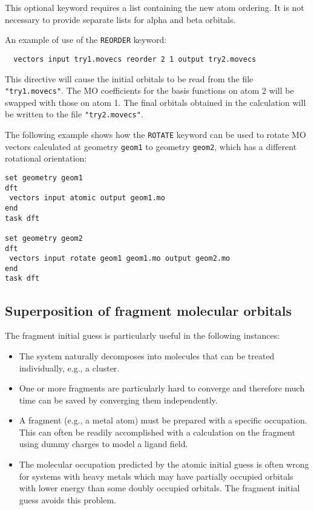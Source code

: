 This optional keyword requires a list containing the new atom ordering.
It is not necessary to provide separate lists for alpha and 
beta orbitals. 

An example of use of the \verb+REORDER+ keyword:
\begin{verbatim}
  vectors input try1.movecs reorder 2 1 output try2.movecs
\end{verbatim}
This directive will cause the initial orbitals to be read from the
file \verb+"try1.movecs"+.  The MO coefficients for the basis functions
on atom 2 
will be swapped with those on atom 1.
The final orbitals obtained in
the calculation will be written to the file \verb+"try2.movecs"+.

The following example shows how the \verb+ROTATE+ keyword can be used to rotate
MO vectors calculated at geometry \verb+geom1+ to geometry \verb+geom2+, which has a 
different rotational orientation:

\begin{verbatim}
set geometry geom1
dft
 vectors input atomic output geom1.mo
end
task dft

set geometry geom2
dft
 vectors input rotate geom1 geom1.mo output geom2.mo
end
task dft

\end{verbatim}
\subsection{Superposition of fragment molecular orbitals}
\label{sec:fragguess}

The fragment initial guess is particularly useful in the following
instances:
\begin{itemize}
\item The system naturally decomposes into molecules that can be
  treated individually, e.g., a cluster.
\item One or more fragments are particularly hard to converge and
  therefore much time can be saved by converging them independently.
\item A fragment (e.g., a metal atom) must be prepared with a specific
  occupation.  This can often be readily accomplished with a
  calculation on the fragment using dummy charges to model a ligand
  field.
\item The molecular occupation predicted by the atomic initial guess
  is often wrong for systems with heavy metals which may have
  partially occupied orbitals with lower energy than some doubly
  occupied orbitals.  The fragment initial guess avoids this problem.
\end{itemize}


